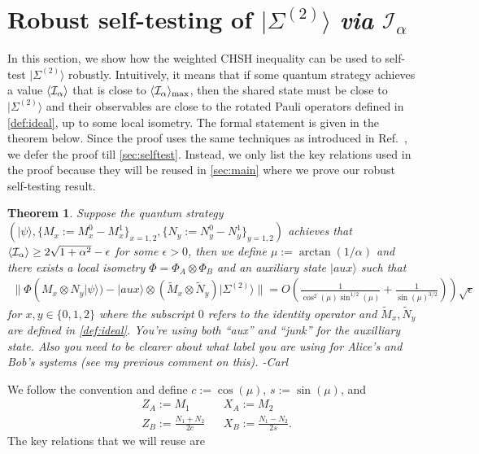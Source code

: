 \documentclass[11pt,letterpaper]{article}
\newcommand{\ket}[1]{|#1\rangle}
\newcommand{\x}{\otimes}
\DeclarePairedDelimiter{\ip}{\langle}{\rangle}
\newcommand{\1}{\mathbb{1}}
\newcommand{\EPR}[1]{\Sigma^{(#1)}}
\newcommand{\tM}{\tilde{M}}
\newcommand{\tN}{\tilde{N}}
\newcommand{\I}{\mathcal{I}}
\def\carl#1{{\color{blue} #1 -Carl}}
\newtheorem{theorem}{Theorem}[section]
\theoremstyle{definition}
\begin{document}
\section{Robust self-testing of $\ket{\EPR{2}}$ \textit{via} $\I_\alpha$}
\label{sec:chsh}
In this section, we show how the weighted CHSH inequality can be used to self-test $\ket{\EPR{2}}$ robustly.
Intuitively, it means that if some quantum strategy achieves a value $\ip{\I_\alpha}$ that is close to $\ip{\I_\alpha}_{\max}$,
then the shared state must be close to $\ket{\EPR{2}}$ and their observables are close to the rotated Pauli operators 
defined in \cref{def:ideal},
up to some local isometry.
The formal statement is given in the theorem below. Since the proof uses the same techniques as introduced in Ref.~\cite{bamps2015},
we defer the proof till \cref{sec:selftest}. Instead, we only list the key relations used in the proof because they will be reused in 
\cref{sec:main} where we prove our robust self-testing result.
\begin{theorem}
\label{thm:selftest}
	Suppose the quantum strategy $(\ket{\psi}, \{M_x:=M_x^0-M_x^1\}_{x=1,2}, \{N_y :=N_y^0-N_y^1\}_{y = 1,2} )$ achieves that
	$\ip{\I_\alpha} \geq 2\sqrt{1+\alpha^2} - \epsilon$
	for some $\epsilon > 0$, then we define $\mu := \arctan(1/\alpha)$ and
	there exists a local isometry $\Phi = \Phi_A \x \Phi_B$ and an auxiliary state $\ket{aux}$  such that
	\begin{align*}
		\| \Phi( M_x \x N_y \ket{\psi}) -\ket{aux} \x (\tM_x \x \tN_y) \ket{\EPR{2}}  \| = O(\frac{1}{\cos^2(\mu)\sin^{1/2}(\mu)}+
		\frac{1}{\sin(\mu)^{3/2}})) \sqrt{\epsilon}
	\end{align*}
	for $x,y \in \{0, 1, 2\}$ where the subscript $0$ refers to the identity operator and $\tM_x, \tN_y$ are 
	defined in \cref{def:ideal}.  \carl{You're using both ``aux'' and ``junk'' for the auxilliary state.  Also you need
	to be clearer about what label you are using for Alice's and Bob's systems (see my previous comment on this).}
\end{theorem}
We follow the convention and define $c := \cos(\mu)$, $s := \sin(\mu)$, and
\begin{align*}
	&Z_A := M_1 && X_A := M_2\\
	&Z_B := \frac{N_1+N_2}{2c} && X_B := \frac{N_1-N_2}{2s}.
\end{align*}
The key relations that we will reuse are
\end{document}
